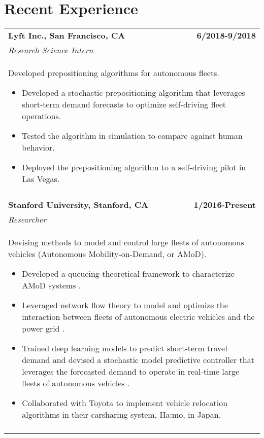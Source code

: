 \documentclass[a4paper,10pt]{article}
\begin{document}
\section{Recent Experience}
\begin{tabularx}{\textwidth}{Xr}

 \bf{Lyft Inc.}, San Francisco, CA & \bf{6/2018-9/2018}\\
 \emph{Research Science Intern} &\\
 \multicolumn{2}{p{0.98\textwidth}}{
 Developed prepositioning algorithms for autonomous fleets.
 \begin{itemize}
 	\item Developed a stochastic prepositioning algorithm that leverages short-term demand forecasts to optimize self-driving fleet operations.
 	\item Tested the algorithm in simulation to compare against human behavior.%
 	\item Deployed the prepositioning algorithm to a self-driving pilot in Las Vegas.%
 \end{itemize}
 }\\
 \multicolumn{2}{c}{} \\


 \bf{Stanford University}, Stanford, CA & \bf{1/2016-Present}\\
 \emph{Researcher} &\\
 \multicolumn{2}{p{0.98\textwidth}}{
 Devising methods to model and control large fleets of autonomous vehicles (Autonomous Mobility-on-Demand, or AMoD). 
 \begin{itemize}
 	\item Developed a queueing-theoretical framework to characterize AMoD systems \cite{IglesiasRossiEtAl2016,IglesiasRossiEtAl2017}.
 	\item Leveraged network flow theory to model and optimize the interaction between fleets of autonomous electric vehicles and the power grid \cite{RossiIglesiasEtAl2018,RossiIglesiasEtAl2018b}.
 	\item Trained deep learning models to predict short-term travel demand and devised a stochastic model predictive controller that leverages the forecasted demand to operate in real-time large fleets of autonomous vehicles \cite{IglesiasRossiEtAl2018,TsaoIglesiasEtAl}.
 	\item Collaborated with Toyota to implement vehicle relocation algorithms in their carsharing system, Ha:mo, in Japan.
 \end{itemize}
 }\\
 \multicolumn{2}{c}{} \\


\end{tabularx}
\end{document}
